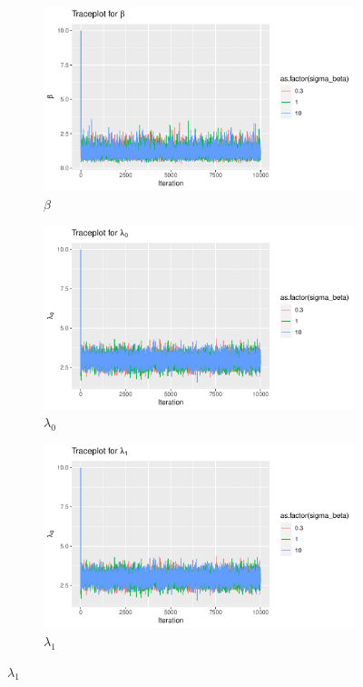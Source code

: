 \begin{figure}[H]
    \centering
    \begin{subfigure}[b]{0.49\textwidth}
        \centering
        \includegraphics[width = \textwidth]{Images/tuning_beta_block_beta.pdf}
        \caption{$\beta$}

    \end{subfigure}
    \begin{subfigure}[b]{0.49\textwidth}
        \centering
        \includegraphics[width = \textwidth]{Images/tuning_lambda_0_block_beta.pdf}
        \caption{$\lambda_0$}

    \end{subfigure}
    \begin{subfigure}[b]{0.49\textwidth}
        \centering
        \includegraphics[width = \textwidth]{Images/tuning_lambda_1_block_beta.pdf}
        \caption{$\lambda_1$}


\end{subfigure}
\end{figure}

